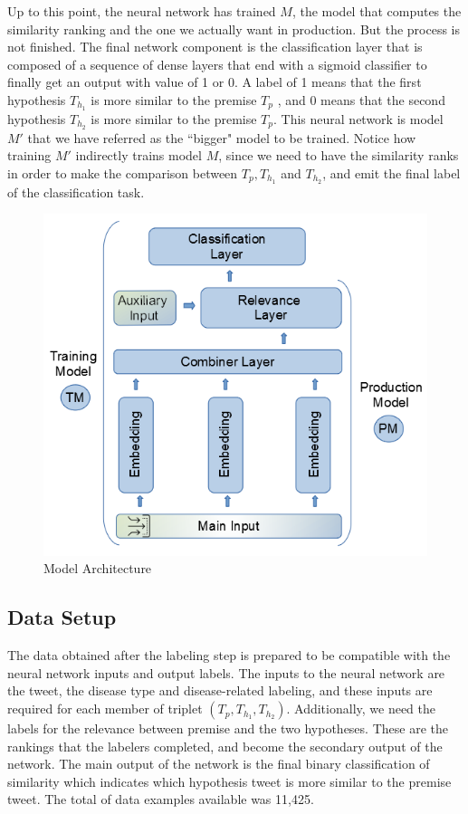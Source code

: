 \documentclass[12pt]{report}
\begin{document}
Up to this point, the neural network has trained $M$, the model that computes the similarity ranking and the one we
actually want in production. But  the process
is not finished.
The final network component is the classification layer that is composed of a sequence of dense layers that end with a sigmoid classifier to finally get an output with value of 1 or 0. A label of  1 means that the first hypothesis  $T_{h_1}$ is more similar to the premise $T_p$ , and 0 means that the second hypothesis
$T_{h_2}$ is more similar to the premise $T_p$. This neural network is model $M'$ that we have referred as the ``bigger" model to be trained. Notice how 
training $M'$ indirectly trains model $M$, since we need to have the similarity ranks in order to make the comparison between $T_p, T_{h_1}$ and $T_{h_2}$, and emit the final label of the classification task. 
\begin{figure}[htbp]	
	\centering
	\includegraphics[width=140mm, scale = 1]{images/11_all_model.png}	
	\caption{Model Architecture}	
	\label{figure:all_model}
\end{figure}


\subsection{Data Setup}
The data obtained after the labeling step is prepared to be compatible with the neural network inputs and output labels. The inputs to the neural network are the tweet, the disease type and disease-related labeling, and these inputs are required for each member of triplet $(T_p, T_{h_1},T_{h_2})$. 
Additionally, we need the labels for the relevance between premise and the two hypotheses. These are the rankings that the labelers completed,  and become the secondary output of the network. The main output of the network is the  final binary classification of similarity which  indicates which hypothesis tweet is more similar to the premise tweet. 
 The total of data examples available was 11,425.
\end{document}

